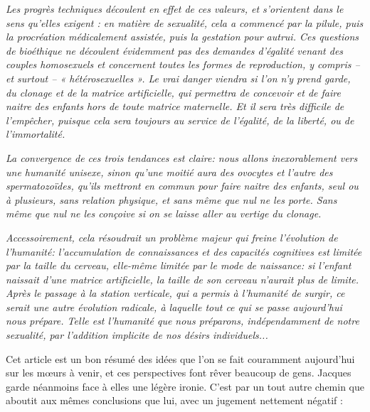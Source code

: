 \begin{displayquote}
\emph{\quarto Les progrès techniques découlent en effet de ces valeurs, et s'orientent dans le sens qu'elles exigent : en matière de sexualité, cela a commencé par la pilule, puis la procréation médicalement assistée, puis la gestation pour autrui. Ces questions de bioéthique ne découlent évidemment pas des demandes d'égalité venant des couples homosexuels et concernent toutes les formes de reproduction, y compris -- et surtout -- « hétérosexuelles ». Le vrai danger viendra si l'on n'y prend garde, du clonage et de la matrice artificielle, qui permettra de concevoir et de faire naitre des enfants hors de toute matrice maternelle. Et il sera très difficile de l'empêcher, puisque cela sera toujours au service de l'égalité, de la liberté, ou de l'immortalité.}
 
\emph{ La convergence de ces trois tendances est claire: nous allons inexorablement vers une humanité unisexe, sinon qu'une moitié aura des ovocytes et l'autre des spermatozoïdes, qu'ils mettront en commun pour faire naitre des enfants, seul ou à plusieurs, sans relation physique, et sans même que nul ne les porte. Sans même que nul ne les conçoive si on se laisse aller au vertige du clonage.}
 
\emph{ Accessoirement, cela résoudrait un problème majeur qui freine l'évolution de l'humanité: l'accumulation de connaissances et des capacités cognitives est limitée par la taille du cerveau, elle-même limitée par le mode de naissance: si l'enfant naissait d'une matrice artificielle, la taille de son cerveau n'aurait plus de limite. Après le passage à la station verticale, qui a permis à l'humanité de surgir, ce serait une autre évolution radicale, à laquelle tout ce qui se passe aujourd'hui nous prépare. Telle est l'humanité que nous préparons, indépendamment de notre sexualité, par l'addition implicite de nos désirs individuels...}
\end{displayquote}


Cet article est un bon résumé des idées que l'on se fait couramment aujourd'hui sur les mœurs à venir, et ces perspectives font rêver beaucoup de gens. Jacques  garde néanmoins face à elles une légère ironie. C'est par un tout autre chemin que  aboutit aux mêmes conclusions que lui, avec un jugement nettement négatif  :


